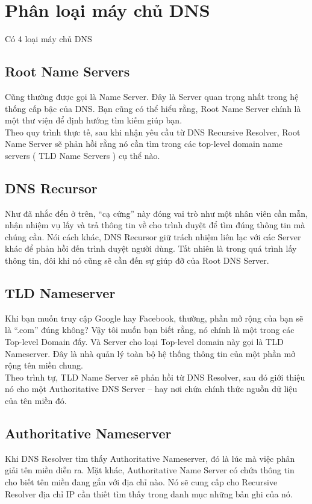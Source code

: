 \documentclass{article}
\begin{document}
\section{Phân loại máy chủ DNS}
Có 4 loại máy chủ DNS
\subsection{Root Name Servers}
Cũng thường được gọi là Name Server. Đây là Server quan trọng nhất trong hệ thống cấp bậc của DNS. Bạn cũng có thể hiểu rằng, Root Name Server chính là một thư viện để định hướng tìm kiếm giúp bạn.\\
Theo quy trình thực tế, sau khi nhận yêu cầu từ DNS Recursive Resolver, Root Name Server sẽ phản hồi rằng nó cần tìm trong các top-level domain name servers ( TLD Name Servers ) cụ thể nào.
\subsection{DNS Recursor}
Như đã nhắc đến ở trên, “cạ cứng” này đóng vai trò như một nhân viên cần mẫn, nhận nhiệm vụ lấy và trả thông tin về cho trình duyệt để tìm đúng thông tin mà chúng cần. Nói cách khác, DNS Recursor giữ trách nhiệm liên lạc với các Server khác để phản hồi đến trình duyệt người dùng. Tất nhiên là trong quá trình lấy thông tin, đôi khi nó cũng sẽ cần đến sự giúp đỡ của Root DNS Server.
\subsection{TLD Nameserver}
Khi bạn muốn truy cập Google hay Facebook, thường, phần mở rộng của bạn sẽ là “.com” đúng không? Vậy tôi muốn bạn biết rằng, nó chính là một trong các Top-level Domain đấy. Và Server cho loại Top-level domain này gọi là TLD Nameserver. Đây là nhà quản lý toàn bộ hệ thống thông tin của một phần mở rộng tên miền chung.\\
Theo trình tự, TLD Name Server sẽ phản hồi từ DNS Resolver, sau đó giới thiệu nó cho một Authoritative DNS Server – hay nơi chứa chính thức nguồn dữ liệu của tên miền đó.
\subsection{Authoritative Nameserver}
Khi DNS Resolver tìm thấy Authoritative Nameserver, đó là lúc mà việc phân giải tên miền diễn ra. Mặt khác, Authoritative Name Server có chứa thông tin cho biết tên miền đang gắn với địa chỉ nào. Nó sẽ cung cấp cho Recursive Resolver địa chỉ IP cần thiết tìm thấy trong danh mục những bản ghi của nó.
\end{document}
